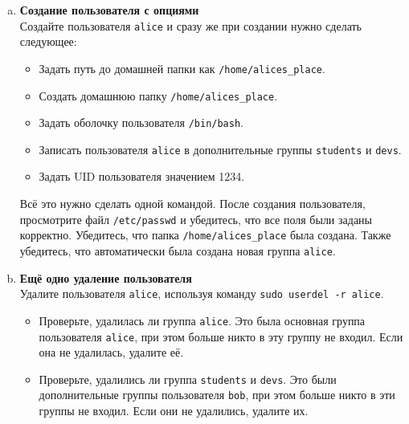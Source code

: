 \documentclass{article}
\begin{document}
\begin{enumerate}[a.]
\item \textbf{Создание пользователя с опциями}\\
Создайте пользователя \texttt{alice} и сразу же при создании нужно сделать следующее:
\begin{itemize}
\item Задать путь до домашней папки как \texttt{/home/alices\_place}.
\item Создать домашнюю папку \texttt{/home/alices\_place}.
\item Задать оболочку пользователя \texttt{/bin/bash}.
\item Записать пользователя \texttt{alice} в дополнительные группы \texttt{students} и \texttt{devs}.
\item Задать UID пользователя значением 1234.
\end{itemize}
Всё это нужно сделать одной командой. После создания пользователя, просмотрите файл \texttt{/etc/passwd} и убедитесь, что все поля были заданы корректно. Убедитесь, что папка \texttt{/home/alices\_place} была создана. Также убедитесь, что автоматически была создана новая группа \texttt{alice}. 

\item \textbf{Ещё одно удаление пользователя}\\
Удалите пользователя \texttt{alice}, используя команду \texttt{sudo userdel -r alice}.
\begin{itemize}
\item Проверьте, удалилась ли группа \texttt{alice}. Это была основная группа пользователя \texttt{alice}, при этом больше никто в эту группу не входил. Если она не удалилась, удалите её.
\item Проверьте, удалились ли группа \texttt{students} и \texttt{devs}. Это были дополнительные группы пользователя \texttt{bob}, при этом больше никто в эти группы не входил. Если они не удалились, удалите их.
\end{itemize}

\end{enumerate}
\end{document}
